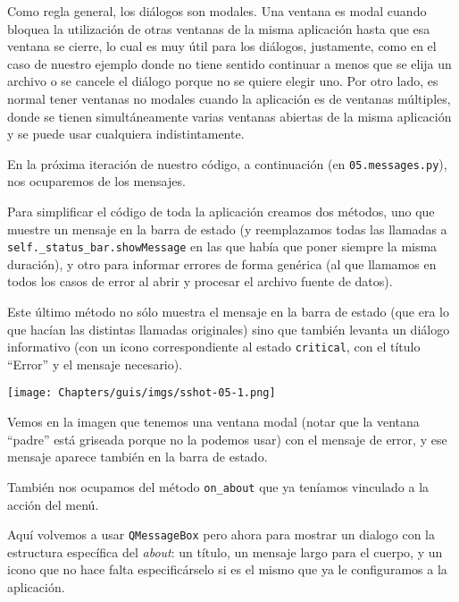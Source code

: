 Como regla general, los diálogos son modales. Una ventana es modal cuando bloquea la utilización de otras ventanas de la misma aplicación hasta que esa ventana se cierre, lo cual es muy útil para los diálogos, justamente, como en el caso de nuestro ejemplo donde no tiene sentido continuar a menos que se elija un archivo o se cancele el diálogo porque no se quiere elegir uno. Por otro lado, es normal tener ventanas no modales cuando la aplicación es de ventanas múltiples, donde se tienen simultáneamente varias ventanas abiertas de la misma aplicación y se puede usar cualquiera indistintamente.

En la próxima iteración de nuestro código, a continuación (en \texttt{05.messages.py}), nos ocuparemos de los mensajes. 

Para simplificar el código de toda la aplicación creamos dos métodos, uno que muestre un mensaje en la barra de estado (y reemplazamos todas las llamadas a \texttt{self.\_status\_bar.showMessage} en las que había que poner siempre la misma duración), y otro para informar errores de forma genérica (al que llamamos en todos los casos de error al abrir y procesar el archivo fuente de datos).


Este último método no sólo muestra el mensaje en la barra de estado (que era lo que hacían las distintas llamadas originales) sino que también levanta un diálogo informativo (con un icono correspondiente al estado \texttt{critical}, con el título ``Error'' y el mensaje necesario).

\begin{center}
    \texttt{[image: Chapters/guis/imgs/sshot-05-1.png]}
\end{center}

Vemos en la imagen que tenemos una ventana modal (notar que la ventana ``padre'' está griseada porque no la podemos usar) con el mensaje de error, y ese mensaje aparece también en la barra de estado.

También nos ocupamos del método \texttt{on\_about} que ya teníamos vinculado a la acción del menú.


Aquí volvemos a usar \texttt{QMessageBox} pero ahora para mostrar un dialogo con la estructura específica del \textit{about}: un título, un mensaje largo para el cuerpo, y un icono que no hace falta especificárselo si es el mismo que ya le configuramos a la aplicación.

